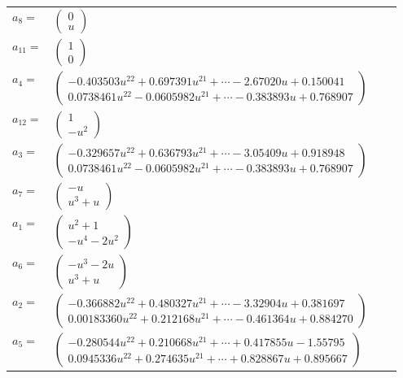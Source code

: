 \documentclass[1p]{elsarticle_modified}
\theoremstyle{definition}
\begin{document}
\begin{tabular}{m{7pt} m{180pt} m{7pt} m{180pt} }
\flushright $a_{8}=$&$\begin{pmatrix}0\\u\end{pmatrix}$ \\
\flushright $a_{11}=$&$\begin{pmatrix}1\\0\end{pmatrix}$ \\
\flushright $a_{4}=$&$\begin{pmatrix}-0.403503 u^{22}+0.697391 u^{21}+\cdots-2.67020 u+0.150041\\0.0738461 u^{22}-0.0605982 u^{21}+\cdots-0.383893 u+0.768907\end{pmatrix}$ \\
\flushright $a_{12}=$&$\begin{pmatrix}1\\- u^2\end{pmatrix}$ \\
\flushright $a_{3}=$&$\begin{pmatrix}-0.329657 u^{22}+0.636793 u^{21}+\cdots-3.05409 u+0.918948\\0.0738461 u^{22}-0.0605982 u^{21}+\cdots-0.383893 u+0.768907\end{pmatrix}$ \\
\flushright $a_{7}=$&$\begin{pmatrix}- u\\u^3+u\end{pmatrix}$ \\
\flushright $a_{1}=$&$\begin{pmatrix}u^2+1\\- u^4-2 u^2\end{pmatrix}$ \\
\flushright $a_{6}=$&$\begin{pmatrix}- u^3-2 u\\u^3+u\end{pmatrix}$ \\
\flushright $a_{2}=$&$\begin{pmatrix}-0.366882 u^{22}+0.480327 u^{21}+\cdots-3.32904 u+0.381697\\0.00183360 u^{22}+0.212168 u^{21}+\cdots-0.461364 u+0.884270\end{pmatrix}$ \\
\flushright $a_{5}=$&$\begin{pmatrix}-0.280544 u^{22}+0.210668 u^{21}+\cdots+0.417855 u-1.55795\\0.0945336 u^{22}+0.274635 u^{21}+\cdots+0.828867 u+0.895667\end{pmatrix}$ \\

\end{tabular}
\end{document}
